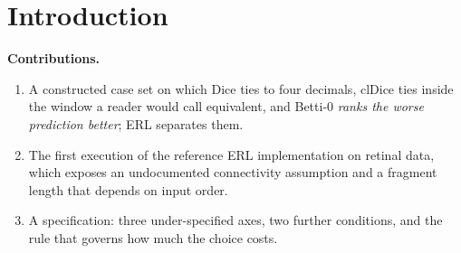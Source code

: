 \section{Introduction}
\label{sec:intro}
%


\noindent\textbf{Contributions.}
\begin{enumerate}
  \item A constructed case set on which Dice ties to four decimals, clDice
        ties inside the window a reader would call equivalent, and Betti-0
        \emph{ranks the worse prediction better}; ERL separates them.
  \item The first execution of the reference ERL implementation on retinal
        data, which exposes an undocumented connectivity assumption and a
        fragment length that depends on input order.
  \item A specification: three under-specified axes, two further conditions,
        and the rule that governs how much the choice costs.
\end{enumerate}
